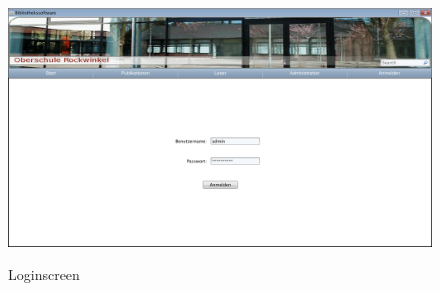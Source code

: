 \documentclass[fontsize=12pt,paper=a4,twoside]{scrartcl}
\begin{document}
\begin{figure}[htbp]
\caption{Loginscreen}
\includegraphics[width=1\textwidth]{WebApp-Screens/Loginscreen.png}
  \label{login}
\end{figure}
\end{document}
